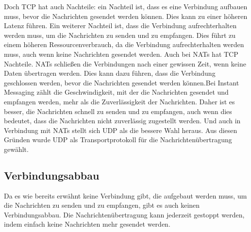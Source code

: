 Doch TCP hat auch Nachteile: ein Nachteil ist, dass es eine Verbindung aufbauen muss, bevor die Nachrichten gesendet werden können. Dies kann zu einer höheren Latenz führen. Ein weiterer Nachteil ist, dass die Verbindung aufrechterhalten werden muss, um die Nachrichten zu senden und zu empfangen. Dies führt zu einem höheren Ressourcenverbrauch, da die Verbindung aufrechterhalten werden muss, auch wenn keine Nachrichten gesendet werden. Auch bei NATs hat TCP Nachteile. NATs schließen die Verbindungen nach einer gewissen Zeit, wenn keine Daten übertragen werden. Dies kann dazu führen, dass die Verbindung geschlossen werden, bevor die Nachrichten gesendet werden können.Bei Instant Messaging zählt die Geschwindigkeit, mit der die Nachrichten gesendet und empfangen werden, mehr als die Zuverlässigkeit der Nachrichten.
Daher ist es besser, die Nachrichten schnell zu senden und zu empfangen, auch wenn dies bedeutet, dass die Nachrichten nicht zuverlässig zugestellt werden. Und auch in Verbindung mit NATs stellt sich UDP als die bessere Wahl heraus. Aus diesen Gründen wurde UDP als Transportprotokoll für die Nachrichtenübertragung gewählt.


\subsection{Verbindungsabbau}

Da es wie bereits erwähnt keine Verbindung gibt, die aufgebaut werden muss, um die Nachrichten zu senden und zu empfangen, gibt es auch keinen Verbindungsabbau. Die Nachrichtenübertragung kann jederzeit gestoppt werden, indem einfach keine Nachrichten mehr gesendet werden. 
